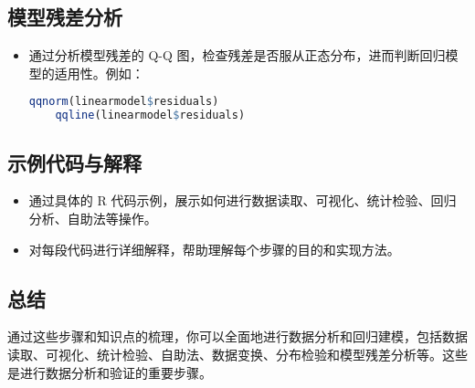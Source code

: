 \documentclass[UTF8]{report}
\theoremstyle{MyLineTheoremStyle} %
\theoremstyle{MyBlockTheoremStyle} %
\theoremstyle{MySubsubsectionStyle} %
\begin{document}
\subsection*{模型残差分析}

\begin{itemize}
    \item 通过分析模型残差的 Q-Q 图，检查残差是否服从正态分布，进而判断回归模型的适用性。例如：
    \begin{lstlisting}[language=R]
    qqnorm(linearmodel$residuals)
    qqline(linearmodel$residuals)
    \end{lstlisting}
\end{itemize}

\subsection*{示例代码与解释}

\begin{itemize}
    \item 通过具体的 R 代码示例，展示如何进行数据读取、可视化、统计检验、回归分析、自助法等操作。
    \item 对每段代码进行详细解释，帮助理解每个步骤的目的和实现方法。
\end{itemize}

\subsection*{总结}

通过这些步骤和知识点的梳理，你可以全面地进行数据分析和回归建模，包括数据读取、可视化、统计检验、自助法、数据变换、分布检验和模型残差分析等。这些是进行数据分析和验证的重要步骤。
\end{document}
